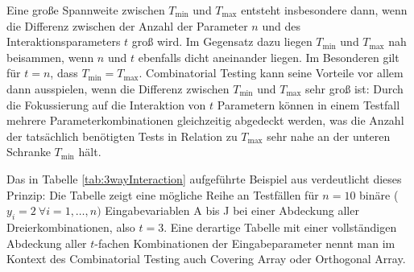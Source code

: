 Eine große Spannweite zwischen $T_{\min}$ und $T_{\max}$ entsteht insbesondere dann, wenn die Differenz zwischen der Anzahl der Parameter $n$ und des Interaktionsparameters $t$ groß wird. Im Gegensatz dazu liegen $T_{\min}$ und $T_{\max}$ nah beisammen, wenn $n$ und $t$ ebenfalls dicht aneinander liegen. Im Besonderen gilt für $t=n$, dass $T_{\min} = T_{\max}$. Combinatorial Testing kann seine Vorteile vor allem dann ausspielen, wenn die Differenz zwischen $T_{\min}$ und $T_{\max}$ sehr groß ist: Durch die Fokussierung auf die Interaktion von $t$ Parametern können in einem Testfall mehrere Parameterkombinationen gleichzeitig abgedeckt werden, was die Anzahl der tatsächlich benötigten Tests in Relation zu $T_{\max}$ sehr nahe an der unteren Schranke $T_{\min}$ hält.

Das in Tabelle \ref{tab:3wayInteraction} aufgeführte Beispiel aus \cite{kuhn2010practical} verdeutlicht dieses Prinzip: Die Tabelle zeigt eine mögliche Reihe an Testfällen für $n=10$ binäre ($y_i = 2 ~ \forall i = 1,\dots,n)$ Eingabevariablen A bis J bei einer Abdeckung aller Dreierkombinationen, also $t = 3$. Eine derartige Tabelle mit einer vollständigen Abdeckung aller $t$-fachen Kombinationen der Eingabeparameter nennt man im Kontext des Combinatorial Testing auch Covering Array oder Orthogonal Array. 

